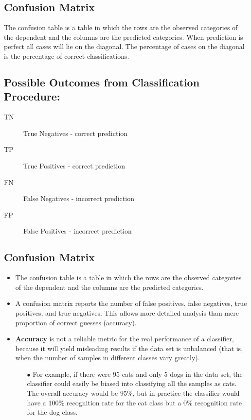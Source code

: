 \documentclass[a4paper,12pt]{article}
\begin{document}
\subsection*{Confusion Matrix}
The confusion table is a table in which the rows are the observed categories of
the dependent and the columns are the predicted categories. When prediction
is perfect all cases will lie on the diagonal. The percentage of cases on the
diagonal is the percentage of correct classifications. 	
	\subsection*{Possible Outcomes from Classification Procedure:}
	\begin{description}
		\item[TN] True Negatives - correct prediction
		\item[TP] True Positives - correct prediction
		\item[FN] False Negatives - incorrect prediction
		\item[FP] False Positives - incorrect prediction
	\end{description}

\subsection*{Confusion Matrix}
\begin{itemize}
	\item The confusion table is a table in which the rows are the observed categories of
	the dependent and the columns are the predicted categories. 
	\item A confusion matrix reports
	the number of false positives, false negatives, true positives, and true
	negatives. This allows more detailed analysis than mere proportion of correct guesses
	(accuracy). 
	\item \textbf{Accuracy} is not a reliable metric for the real performance of a
	classifier, because it will yield misleading results if the data set is unbalanced
	(that is, when the number of samples in different classes vary greatly).
	\begin{itemize}
		\item[$\bullet$] For example, if there were 95 cats and only 5 dogs in the data set, the
		classifier could easily be biased into classifying all the samples as cats. The
		overall accuracy would be 95\%, but in practice the classifier would have a
		100\% recognition rate for the cat class but a 0\% recognition rate for the dog
		class.
	\end{itemize}
\end{itemize}
\end{document}
